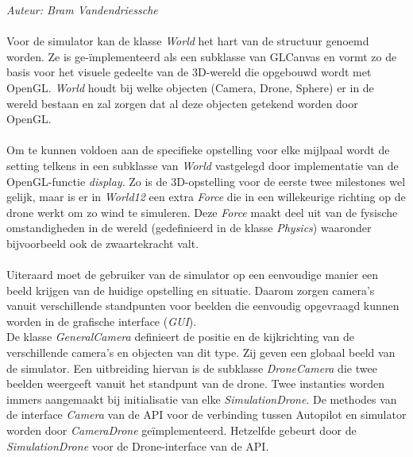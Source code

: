 {\em Auteur: Bram Vandendriessche}
\\
\\
Voor de simulator kan de klasse \textit{World} het hart van de structuur genoemd worden. Ze is ge-\"implementeerd als een subklasse van GLCanvas en vormt zo de basis voor het visuele gedeelte van de 3D-wereld die opgebouwd wordt met OpenGL. \textit{World} houdt bij welke objecten (Camera, Drone, Sphere) er in de wereld bestaan en zal zorgen dat al deze objecten getekend worden door OpenGL. 
\\
\\
Om te kunnen voldoen aan de specifieke opstelling voor elke mijlpaal wordt de setting telkens in een subklasse van \textit{World} vastgelegd door implementatie van de OpenGL-functie \textit{display}. Zo is de 3D-opstelling voor de eerste twee milestones wel gelijk, maar is er in \textit{World12} een extra \textit{Force} die in een willekeurige richting op de drone werkt om zo wind te simuleren. Deze \textit{Force} maakt deel uit van de fysische omstandigheden in de wereld (gedefinieerd in de klasse \textit{Physics}) waaronder bijvoorbeeld ook de zwaartekracht valt. 
\\
\\
Uiteraard moet de gebruiker van de simulator op een eenvoudige manier een beeld krijgen van de huidige opstelling en situatie. Daarom zorgen camera's vanuit verschillende standpunten voor beelden die eenvoudig opgevraagd kunnen worden in de grafische interface (\textit{GUI}). \\
De klasse \textit{GeneralCamera} definieert de positie en de kijkrichting van de verschillende camera's en objecten van dit type. Zij geven een globaal beeld van de simulator. Een uitbreiding hiervan is de subklasse \textit{DroneCamera} die twee beelden weergeeft vanuit het standpunt van de drone. Twee instanties worden immers aangemaakt bij initialisatie van elke \textit{SimulationDrone}. De methodes van de interface \textit{Camera} van de API voor de verbinding tussen Autopilot en simulator worden door \textit{CameraDrone} ge\"implementeerd. Hetzelfde gebeurt door de \textit{SimulationDrone} voor de Drone-interface van de API.